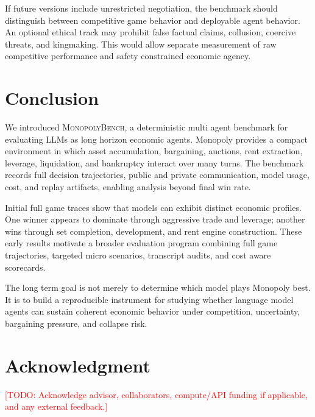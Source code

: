 \documentclass[conference]{IEEEtran}
\newcommand{\Bench}{\textsc{MonopolyBench}}
\newcommand{\todo}[1]{\textcolor{red}{[TODO: #1]}}
\begin{document}
If future versions include unrestricted negotiation, the benchmark should distinguish between competitive game behavior and deployable agent behavior. An optional ethical track may prohibit false factual claims, collusion, coercive threats, and kingmaking. This would allow separate measurement of raw competitive performance and safety constrained economic agency.

\section{Conclusion}
\label{sec:conclusion}

We introduced \Bench, a deterministic multi agent benchmark for evaluating LLMs as long horizon economic agents. Monopoly provides a compact environment in which asset accumulation, bargaining, auctions, rent extraction, leverage, liquidation, and bankruptcy interact over many turns. The benchmark records full decision trajectories, public and private communication, model usage, cost, and replay artifacts, enabling analysis beyond final win rate.

Initial full game traces show that models can exhibit distinct economic profiles. One winner appears to dominate through aggressive trade and leverage; another wins through set completion, development, and rent engine construction. These early results motivate a broader evaluation program combining full game trajectories, targeted micro scenarios, transcript audits, and cost aware scorecards.

The long term goal is not merely to determine which model plays Monopoly best. It is to build a reproducible instrument for studying whether language model agents can sustain coherent economic behavior under competition, uncertainty, bargaining pressure, and collapse risk.

\section*{Acknowledgment}

\todo{Acknowledge advisor, collaborators, compute/API funding if applicable, and any external feedback.}
\end{document}
